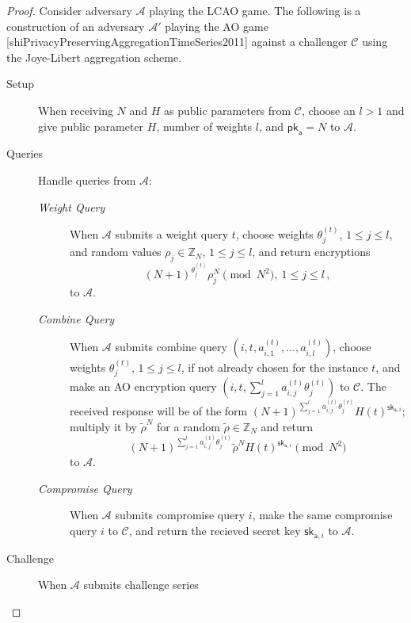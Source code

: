 \begin{proof}
    Consider adversary $\mathcal{A}$ playing the LCAO game. The following is a construction of an adversary $\mathcal{A}'$ playing the AO game [shiPrivacyPreservingAggregationTimeSeries2011] against a challenger $\mathcal{C}$ using the Joye-Libert aggregation scheme.
    \begin{description}
        \item[Setup] When receiving $N$ and $H$ as public parameters from $\mathcal{C}$, choose an $l>1$ and give public parameter $H$, number of weights $l$, and $\mathsf{pk}_{\mathsf{a}}=N$ to $\mathcal{A}$.
        \item[Queries] Handle queries from $\mathcal{A}$:
        \begin{description}
            \item[\textit{Weight Query}] When $\mathcal{A}$ submits a weight query $t$, choose weights $\theta^{(t)}_j$, $1\leq j\leq l$, and random values $\rho_j \in \mathbb{Z}_N$, $1\leq j\leq l$, and return encryptions 
            \begin{equation*}
                (N+1)^{\theta^{(t)}_{j}}\rho_j^N\pmod{N^2},\ 1\leq j\leq l\,,
            \end{equation*}
            to $\mathcal{A}$.
            \item[\textit{Combine Query}] When $\mathcal{A}$ submits combine query $(i, t, a^{(t)}_{i,1},\dots,a^{(t)}_{i,l})$, choose weights $\theta^{(t)}_j$, $1\leq j\leq l$, if not already chosen for the instance $t$, and make an AO encryption query $(i, t, \sum^l_{j=1}a^{(t)}_{i,j}\theta^{(t)}_j)$ to $\mathcal{C}$. The received response will be of the form $(N+1)^{\sum^l_{j=1}a^{(t)}_{i,j}\theta^{(t)}_j}H(t)^{\mathsf{sk}_{\mathsf{a},i}}$; multiply it by $\tilde{\rho}^N$ for a random $\tilde{\rho} \in \mathbb{Z}_N$ and return 
            \begin{equation*}
                (N+1)^{\sum^l_{j=1}a^{(t)}_{i,j}\theta^{(t)}_j}\tilde{\rho}^N H(t)^{\mathsf{sk}_{\mathsf{a},i}} \pmod{N^2}
            \end{equation*}
            to $\mathcal{A}$.
            \item[\textit{Compromise Query}] When $\mathcal{A}$ submits compromise query $i$, make the same compromise query $i$ to $\mathcal{C}$, and return the recieved secret key $\mathsf{sk}_{\mathsf{a},i}$ to $\mathcal{A}$.
        \end{description}
        \item[Challenge] When $\mathcal{A}$ submits challenge series

\end{description}
\end{proof}
